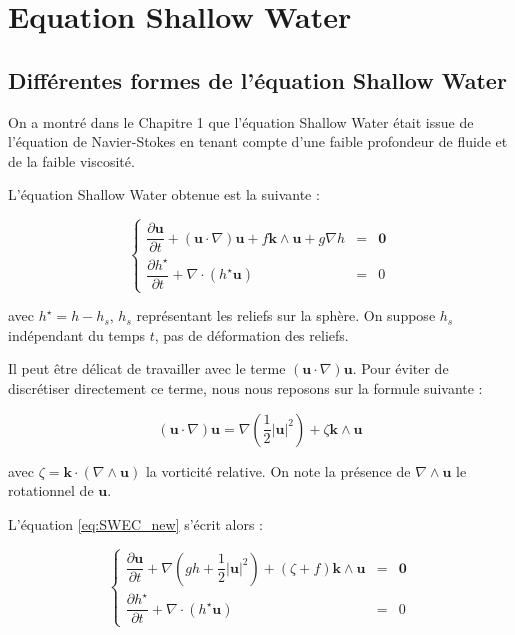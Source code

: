 \section{Equation Shallow Water}

\subsection{Différentes formes de l'équation Shallow Water}

On a montré dans le Chapitre 1 que l'équation Shallow Water était issue de l'équation de Navier-Stokes en tenant compte d'une faible profondeur de fluide et de la faible viscosité.

L'équation Shallow Water obtenue est la suivante :

\begin{equation}
\label{eq:SWEC_new}
\left\lbrace
\begin{array}{rcl}
\dfrac{\partial \mathbf{u}}{\partial t} + \left( \mathbf{u} \cdot \nabla \right) \mathbf{u} + f \mathbf{k} \wedge \mathbf{u} + g \nabla h & = & \mathbf{0} \\
\dfrac{\partial h^{\star}}{\partial t} + \nabla \cdot \left( h^{\star} \mathbf{u} \right) & = & 0
\end{array}
\right.
\end{equation}

avec $h^{\star} = h - h_s$, $h_s$ représentant les reliefs sur la sphère. On suppose $h_s$ indépendant du temps $t$, pas de déformation des reliefs.

Il peut être délicat de travailler avec le terme $\left( \mathbf{u} \cdot \nabla \right) \mathbf{u}$. Pour éviter de discrétiser directement ce terme, nous nous reposons sur la formule suivante :

\begin{equation}
\left( \mathbf{u} \cdot \nabla \right) \mathbf{u} = \nabla \left( \dfrac{1}{2} |\mathbf{u}|^2 \right) + \zeta \mathbf{k} \wedge \mathbf{u}
\end{equation}

avec $\zeta = \mathbf{k} \cdot \left( \nabla \wedge \mathbf{u} \right)$ la vorticité relative. On note la présence de $\nabla \wedge \mathbf{u}$ le rotationnel de $\mathbf{u}$.

L'équation \eqref{eq:SWEC_new} s'écrit alors :

\begin{equation}
\label{eq:SWEC_vectform}
\left\lbrace
\begin{array}{rcl}
\dfrac{\partial \mathbf{u}}{\partial t} + \nabla \left( g h + \dfrac{1}{2} |\mathbf{u}|^2  \right) + \left( \zeta + f \right) \mathbf{k} \wedge \mathbf{u} & = & \mathbf{0} \\
\dfrac{\partial h^{\star}}{\partial t} + \nabla \cdot \left( h^{\star} \mathbf{u} \right) & = & 0
\end{array}
\right.
\end{equation}

